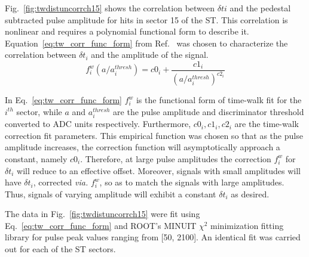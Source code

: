 Fig.~\ref{fig:twdistuncorrch15} shows the correlation between $\delta t{i}$ and the pedestal subtracted pulse amplitude for hits in sector 15 of the ST.  This correlation is nonlinear and requires a polynomial functional form to describe it. Equation~\ref{eq:tw_corr_func_form} from Ref.~\cite{esmith_bcal} was chosen to characterize the correlation between $\delta t_{i}$ and the amplitude of the signal. 
	\begin{equation} \label{eq:tw_corr_func_form}
		f^{w}_{i}\left(a/a^{thresh}_{i}\right) = c0_{i} + \frac{c1_{i}}{(a/a^{thresh}_{i})^{c2_{i}}}
	\end{equation}

In Eq.~\ref{eq:tw_corr_func_form} $f^{w}_{i}$ is the functional form of time-walk fit for the $i^{th}$ sector, while $a$ and $a^{thresh}_{i}$ are the pulse amplitude and discriminator threshold converted to ADC units respectively.  Furthermore, $c0_{i}, c1_{i}, c2_{i}$ are the time-walk correction fit parameters.  This empirical function was chosen so that as the pulse amplitude increases, the correction function will asymptotically approach a constant, namely $c0_{i}$.  Therefore, at large pulse amplitudes the correction $f^{w}_{i}$ for $\delta t_{i}$ will reduce to an effective offset.  Moreover, signals with small amplitudes will have $\delta t_{i}$, corrected \textit{via.} $f^{w}_{i}$, so as to match the signals with large amplitudes.  Thus, signals of varying amplitude will exhibit a constant $\delta t_{i}$ as desired.

The data in Fig.~\ref{fig:twdistuncorrch15} were fit using Eq.~\ref{eq:tw_corr_func_form} and ROOT's MINUIT $\chi^{2}$ minimization fitting library \cite{root_minuit} for pulse peak values ranging from [50, 2100].  An identical fit was carried out for each of the ST sectors. 


